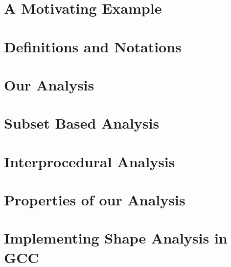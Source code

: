 \documentclass[twocolumn]{svjour3}          %
\begin{document}
\section{A Motivating Example}\label{sec:motiv}


\section{Definitions and Notations} \label{sec:Formal_Definitions}


\section{Our Analysis}\label{sec:Analysis_Rules}


\section{Subset Based Analysis}\label{sec:Subset_Based_Analysis}


\section{Interprocedural Analysis} \label{sec:Interprocedural_Analysis}


\section{Properties of our Analysis}\label{sec:props}


\section{Implementing Shape Analysis in GCC} \label{sec:implementation}

\end{document}
